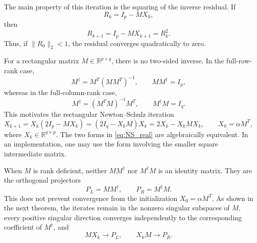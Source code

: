 \documentclass[12pt,a4paper]{article}
\theoremstyle{plain}
\theoremstyle{definition}
\theoremstyle{remark}
\begin{document}
The main property of this iteration is the squaring of the inverse
residual. If
\[
    R_k=I_p-MX_k,
\]
then
\[
    R_{k+1} = I_p-MX_{k+1} = R_k^2.
\]
Thus, if \(\|R_0\|_2<1\), the residual converges quadratically to zero.

For a rectangular matrix \(M\in\mathbb{R}^{p\times q}\), there is no two-sided inverse. In the full-row-rank case,
\[
    M^\dagger=M^T(MM^T)^{-1}, \qquad MM^\dagger=I_p,
\]
whereas in the full-column-rank case,
\[
    M^\dagger=(M^TM)^{-1}M^T, \qquad M^\dagger M=I_q.
\]
This motivates the rectangular Newton--Schulz iteration
\begin{equation} \label{eq:NS_real}
    X_{k+1} = X_k(2I_p-MX_k) = (2I_q-X_kM)X_k = 2X_k-X_kMX_k, \qquad X_0=\alpha M^T,
\end{equation}
where \(X_k\in\mathbb{R}^{q\times p}\). The two forms in \eqref{eq:NS_real} are algebraically equivalent. In an implementation, one may use the form involving the smaller square intermediate matrix.

When \(M\) is rank deficient, neither \(MM^\dagger\) nor \(M^\dagger M\) is an identity matrix. They are the orthogonal projectors
\[
    P_L=MM^\dagger, \qquad P_R=M^\dagger M.
\]
This does not prevent convergence from the initialization \(X_0=\alpha M^T\). As shown in the next theorem, the iterates remain in the nonzero singular subspaces of \(M\), every positive singular direction converges independently to the corresponding coefficient of \(M^\dagger\), and
\[
    MX_k\longrightarrow P_L, \qquad X_kM\longrightarrow P_R.
\]
\end{document}
